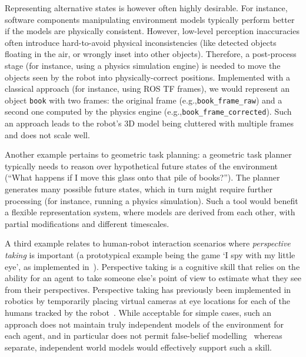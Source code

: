\documentclass[letterpaper, 10pt, conference]{ieeeconf}
\newcommand{\eg}{e.g.,\xspace}
\begin{document}
Representing alternative states is however often highly desirable. For instance,
software components manipulating environment models typically perform better if
the models are physically consistent. However, low-level perception inaccuracies
often introduce hard-to-avoid physical inconsistencies (like detected objects
floating in the air, or wrongly inset into other objects).
Therefore, a post-process stage (for instance, using a physics simulation
engine) is needed to move the objects seen by the robot into
physically-correct positions. Implemented with a classical approach (for
instance, using ROS TF frames), we would represent an object {\tt book} with two
frames: the original frame (\eg {\tt book\_frame\_raw}) and a second one
computed by the physics engine (\eg {\tt book\_frame\_corrected}). Such an
approach leads to the robot's 3D model being cluttered with multiple frames and
does not scale well.

Another example pertains to geometric task planning: a geometric task planner
typically needs to reason over hypothetical future states of the environment
(``What happens if I move this glass onto that pile of books?'').  The planner
generates many possible future states, which in turn might require further
processing (for instance, running a physics simulation). Such a tool would
benefit a flexible representation system, where models are derived from each
other, with partial modifications and different timescales.

A third example relates to human-robot interaction scenarios where \emph{perspective
taking} is important (a prototypical example being the game `I spy with my
little eye', as implemented in~\cite{ros2010which}). Perspective taking is a
cognitive skill that relies on the ability for an agent to take someone else's
point of view to estimate what they see from their perspectives. 
Perspective taking has previously been implemented in robotics by temporarily placing
virtual cameras at eye locations for each of the humans tracked by the
robot~\cite{ros2010solving}. While acceptable for simple cases, such an approach
does not maintain truly independent models of the environment for each
agent, and in particular does not permit false-belief
modelling~\cite{lemaignan2015mutual} whereas separate, independent world models
would effectively support such a skill.
\end{document}
